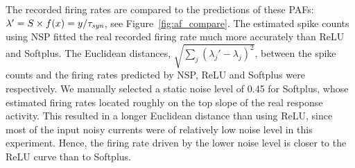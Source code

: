 	The recorded firing rates are compared to the predictions of these PAFs: $\lambda' = S \times f(x) = y/\tau_{\textit{\textrm{syn}}}$, see Figure~\ref{fig:af_compare}.
	The estimated spike counts using NSP fitted the real recorded firing rate much more accurately than ReLU and Softplus.
	The Euclidean distances, $\sqrt{\sum_{j}(\lambda_j' - \lambda_j)^2}$, between the spike counts and the firing rates predicted by NSP, ReLU and Softplus were \DIFdelbegin {}\DIFdelend \DIFaddbegin {}\DIFaddend respectively.
	We manually selected a static noise level of 0.45 for Softplus, whose estimated firing rates located roughly on the top slope of the real response activity.
	This resulted in a longer Euclidean distance than using ReLU, since most of the input noisy currents were of relatively low noise level in this experiment.
	Hence, the firing rate driven by the lower noise level is closer to the ReLU curve than to Softplus.

	\DIFaddbegin {}


